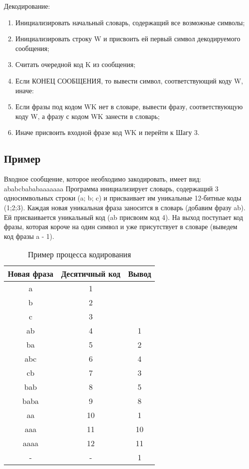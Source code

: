 \documentclass{article}
\begin{document}
Декодирование:
\begin{enumerate}
\item Инициализировать начальный словарь, содержащий все возможные символы;
\item Инициализировать строку W и присвоить ей первый символ декодируемого сообщения;
\item Считать очередной код K из сообщения;
\item Если КОНЕЦ СООБЩЕНИЯ, то вывести символ, соответствующий коду W, иначе:
\item Если фразы под кодом WK нет в словаре, вывести фразу, соответствующую коду W, а фразу с кодом WK занести в словарь;
\item Иначе присвоить входной фразе код WK и перейти к Шагу 3.
\end{enumerate}

\subsection{Пример}

Входное сообщение, которое необходимо закодировать, имеет вид:
ababcbababaaaaaaa
Программа инициализирует словарь, содержащий 3 односимвольных строки (a; b; c) и присваивает им уникальные 12-битные коды (1;2;3). Каждая новая уникальная фраза заносится в словарь (добавим фразу ab). Ей присваивается уникальный код (ab присвоим код 4). На выход поступает код фразы, которая короче на один символ и уже присутствует в словаре (выведем код фразы a - 1).

\begin{table}[h]
\centering
\begin{tabular}{ |c|c|c| } 
 \hline
 Новая фраза & Десятичный код & Вывод \\
 \hline\hline
 a & 1 &  \\
 \hline
 b & 2 &  \\
 \hline
 c & 3 &  \\
 \hline
 ab & 4 & 1 \\
 \hline
 ba & 5 & 2 \\
 \hline
 abc & 6 & 4 \\
 \hline
 cb & 7 & 3 \\
 \hline
 bab & 8 & 5 \\
 \hline
 baba & 9 & 8 \\
 \hline
 aa & 10 & 1 \\
 \hline
 aaa & 11 & 10 \\
 \hline
 aaaa & 12 & 11 \\
 \hline
 - & - & 1 \\
 \hline
\end{tabular}
\caption{\label{tab:widgets}Пример процесса кодирования}
\end{table}
\end{document}
